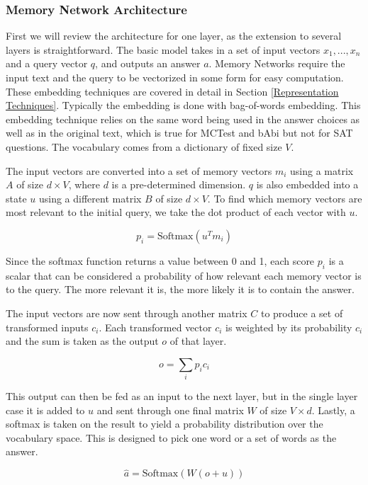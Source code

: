 \documentclass[pageno]{final_paper}
\begin{document}
\subsubsection{Memory Network Architecture}
\label{Memory Network Architecture}

First we will review the architecture for one layer, as the extension to several
layers is straightforward. The basic model takes in a set of input vectors $x_1, ...,
x_n$ and a query vector $q$, and outputs an answer $a$. Memory Networks require
the input text and the query to be vectorized in some form for easy computation.
These embedding techniques are covered in detail in Section \ref{Representation
Techniques}. Typically the embedding is done with bag-of-words embedding. This
embedding technique relies on the same word being used in the answer choices as
well as in the original text, which is true for MCTest and bAbi but not for SAT
questions. The vocabulary comes from a dictionary of fixed size $V$.

The input vectors are converted into a set of memory vectors ${m_i}$ using a
matrix $A$ of size $d\times V$, where $d$ is a pre-determined dimension. $q$ is
also embedded into a state $u$ using a different matrix $B$ of size $d\times V$.
To find which memory vectors are most relevant to the initial query, we take the
dot product of each vector with $u$.

$$p_i = \text{Softmax}(u^Tm_i)$$

Since the softmax function returns a value between 0 and 1, each score $p_i$ is
a scalar that can be considered a probability of how relevant each memory vector
is to the query. The more relevant it is, the more likely it is to contain the
answer.

The input vectors are now sent through another matrix $C$ to produce a set of
transformed inputs ${c_i}$. Each transformed vector $c_i$ is weighted by its
probability $c_i$ and the sum is taken as the output $o$ of that layer.

$$o = \sum_i p_i c_i$$

This output can then be fed as an input to the next layer, but in the single
layer case it is added to $u$ and sent through one final matrix $W$ of size
$V\times d$. Lastly, a softmax is taken on the result to yield a probability
distribution over the vocabulary space. This is designed to pick one word
or a set of words as the answer.

$$\hat{a} = \text{Softmax}\left(W\left(o + u\right)\right)$$
\end{document}
